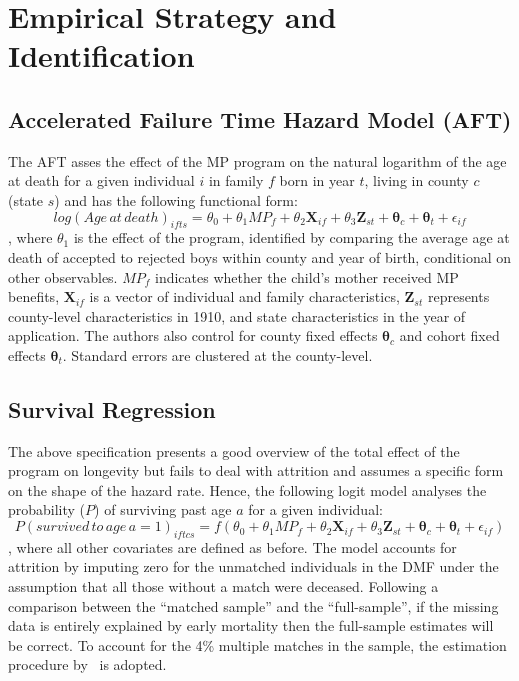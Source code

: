 \section{Empirical Strategy and Identification}\label{empirical}
\subsection{Accelerated Failure Time Hazard Model (AFT)}\label{AFT}
The AFT asses the effect of the MP program on the natural logarithm of the age at death for a given individual $i$ in family $f$ born in year $t$, living in county $c$ (state $s$) and has the following functional form:
$$
log(Age\,at\,death)_{ifts} = \theta_0 + \theta_1MP_f + \theta_2\mathbf{X}_{if} + \theta_3\mathbf{Z}_{st} + \mathbf{\theta}_c + \mathbf{\theta}_t + \epsilon_{if}
$$
, where $\theta_1$ is the effect of the program, identified by comparing the average age at death of accepted to rejected boys within county and year of birth, conditional on other observables. $MP_f$ indicates whether the child's mother received MP benefits, $\mathbf{X}_{if}$ is a vector of individual and family characteristics, $\mathbf{Z}_{st}$ represents county-level characteristics in 1910, and state characteristics in the year of application. The authors also control for county fixed effects $\mathbf{\theta}_c$ and cohort fixed effects $\mathbf{\theta}_t$. Standard errors are clustered at the county-level.
\subsection{Survival Regression}\label{probit}
The above specification presents a good overview of the total effect of the program on longevity but fails to deal with attrition and assumes a specific form on the shape of the hazard rate. Hence, the following logit model analyses the probability ($P$) of surviving past age $a$ for a given individual:
$$
P(survived\,to\,age\,a=1)_{iftcs} = f(\theta_0 + \theta_1MP_f + \theta_2\mathbf{X}_{if} + \theta_3\mathbf{Z}_{st} + \mathbf{\theta}_c + \mathbf{\theta}_t + \epsilon_{if})
$$
, where all other covariates are defined as before. The model accounts
for attrition by imputing zero for the unmatched individuals in the DMF
under the assumption that all those without a match were deceased.
Following a comparison between the ``matched sample'' and the
``full-sample'', if the missing data is entirely explained by early
mortality then the full-sample estimates will be correct. To account for
the 4\% multiple matches in the sample, the estimation procedure
by~\citet{Honore_2004} is adopted.
